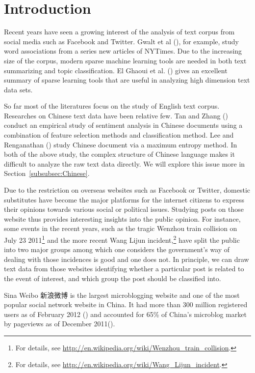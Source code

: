 \documentclass[11pt]{article}
\newcommand{\1}[1]{{\mathbf 1}\left\{#1\right\}}        %
\begin{document}
\section{Introduction}

Recent years have seen a growing interest of the analysis of text corpus from social media such as Facebook and Twitter. Gwalt et al (\cite{gawalt2010discovering}), for example, study word associations from a series new articles of NYTimes. Due to the increasing size of the corpus, modern sparse machine learning tools are needed in both text summarizing and topic classification. El Ghaoui et al. (\cite{ELDPSB:11}) gives an excellent summary of sparse learning tools that are useful in analyzing high dimension text data sets.  


So far most of the literatures focus on the study of English text corpus. Researches on Chinese text data have been relative few. Tan and Zhang (\cite{tan2008empirical}) conduct an empirical study of sentiment analysis in Chinese documents using a combination of feature selection methods and classification method. Lee and Renganathan (\cite{lee2011chinese}) study Chinese document via a maximum entropy method. In both of the above study, the complex structure of Chinese language makes it difficult to analyze the raw text data directly. We will explore this issue more in Section~\ref{subsubsec:Chinese}. 


Due to the restriction on overseas websites such as Facebook or Twitter, domestic substitutes have become the major platforms for the internet citizens to express their opinions towards various social or political issues. Studying posts on those website thus provides interesting insights into the public opinion. For instance, some events in the recent years, such as the tragic Wenzhou train collision on July 23 2011\footnote{For details, see \url{http://en.wikipedia.org/wiki/Wenzhou_train_collision}. }
  and the more recent Wang Lijun incident,\footnote{For details, see \url{http://en.wikipedia.org/wiki/Wang_Lijun_incident}.}  
have split the public into two major groups among which one considers the government's way of dealing with those incidences is good and one does not. 
In principle, we can draw text data from those websites identifying whether a particular post is related to the event of interest, and which group the post should be classified into.

Sina Weibo 新浪微博 is the largest microblogging website and one of the most popular social network website in China. It had more than 300 million registered users as of February 2012 (\cite{bloombergSina})
and accounted for 65\% of China's microblog market by pageviews as of December 2011(\cite{WashingtonPostSina}).
\end{document}
